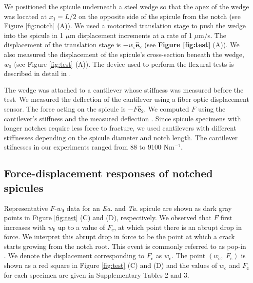 \documentclass[12pt,onecolumn]{article}
\makeatletter
\newcommand{\ey}{\hat{\mathbf{e}}_2}
\newcommand{\TA}{\textit{Ta.\@}\xspace}
\newcommand{\EA}{\textit{Ea.\@}\xspace}
\makeatother
\begin{document}
\begin{bibunit}
We positioned the spicule underneath a steel wedge so that the apex of the wedge was located at $x_1=L/2$ on the opposite side of the spicule from the notch (see Figure \ref{fig:notch} (A)). We used a motorized translation stage to push the wedge into the spicule in 1 $\mu$m displacement increments at a rate of 1 $\mu$m/s. The displacement of the translation stage is $-w_\mathrm{s}\ey$ (see {\bf Figure \ref{fig:test}} (A)). We also measured the displacement of the spicule's cross-section beneath the wedge, $w_0$ (see Figure \ref{fig:test} (A)). The device used to perform the flexural tests is described in detail in \cite{monn2017enhanced,monn2017millimeter}.

The wedge was attached to a cantilever whose stiffness was measured before the test. We measured the deflection of the cantilever using a fiber optic displacement sensor. The force acting on the spicule is $-F\ey$. We computed $F$ using the cantilever's stiffness and the measured deflection \cite{monn2017enhanced}. Since spicule specimens with longer notches require less force to fracture, we used cantilevers with different stiffnesses depending on the spicule diameter and notch length. The cantilever stifnesses in our experiments ranged from 88 to 9100 Nm$^{-1}$.


\subsection*{Force-displacement responses of notched spicules}
\label{sec:fdresp}
Representative $F$-$w_0$ data for an \EA and \TA spicule are shown as dark gray points in Figure \ref{fig:test} (C) and (D), respectively. We observed that $F$ first increases with $w_0$ up to a value of $F_\mathrm{c}$, at which point there is an abrupt drop in force. We interpret this abrupt drop in force to be the point at which a crack starts growing from the notch root. This event is commonly referred to as pop-in \cite{paris1965fracture,jaya2014crack}. We denote the displacement corresponding to $F_\mathrm{c}$ as $w_\mathrm{c}$. The point $(w_\mathrm{c}, \; F_\mathrm{c})$ is shown as a red square in Figure \ref{fig:test} (C) and (D) and the values of $w_\mathrm{c}$ and $F_\mathrm{c}$ for each specimen are given in Supplementary Tables 2 and 3. 


\end{bibunit}
\end{document}

